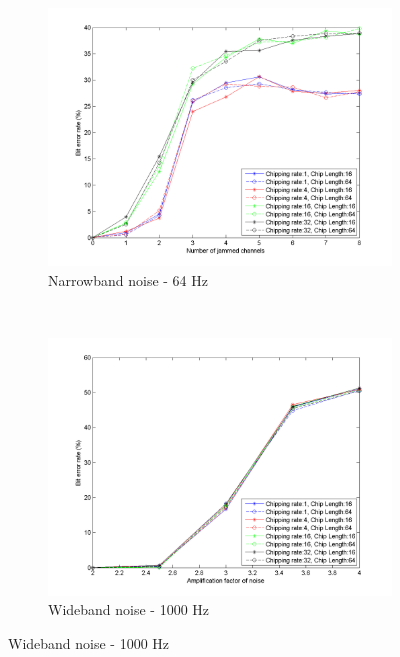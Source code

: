 		\begin{figure}[H]
			\centering
			\begin{subfigure}[b]{0.5\textwidth}
				\includegraphics[width=\textwidth]{imgs/results/plot_mode_fhss-test_narrowband-rep_20-dataRate_8-dataLength_128.png}
				\caption{Narrowband noise - 64 Hz}
				\label{fig:fhss_narrowband}
			\end{subfigure}%
			~
			\begin{subfigure}[b]{0.5\textwidth}
				\includegraphics[width=\textwidth]{imgs/results/plot_mode_fhss-test_wideband-rep_20-dataRate_8-dataLength_128.png}
				\caption{Wideband noise - 1000 Hz}
				\label{fig:fhss_wideband}
			\end{subfigure}
		\end{figure}
		
